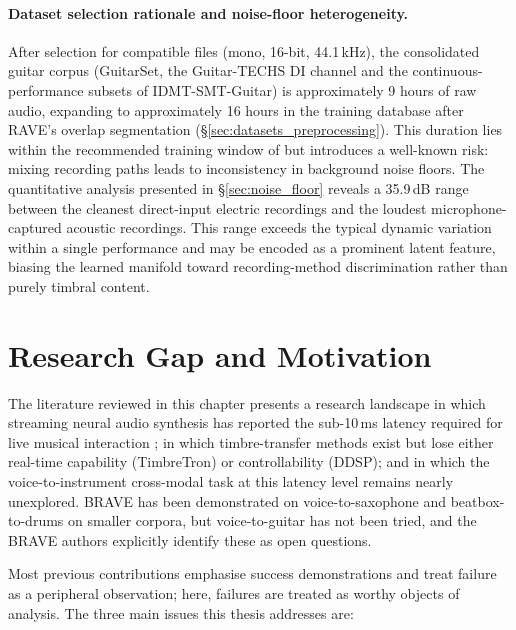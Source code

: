 \documentclass[a4paper,11pt,oneside,openany]{book}
\begin{document}
\paragraph{Dataset selection rationale and noise-floor heterogeneity.} After selection for compatible files (mono, 16-bit, 44.1\,kHz), the consolidated guitar corpus (GuitarSet, the Guitar-TECHS DI channel and the continuous-performance subsets of IDMT-SMT-Guitar) is approximately 9 hours of raw audio, expanding to approximately 16 hours in the training database after RAVE's overlap segmentation (\S\ref{sec:datasets_preprocessing}). This duration lies within the recommended training window of \textcite{caillon2021rave} but introduces a well-known risk: mixing recording paths leads to inconsistency in background noise floors. The quantitative analysis presented in \S\ref{sec:noise_floor} reveals a 35.9\,dB range between the cleanest direct-input electric recordings and the loudest microphone-captured acoustic recordings. This range exceeds the typical dynamic variation within a single performance and may be encoded as a prominent latent feature, biasing the learned manifold toward recording-method discrimination rather than purely timbral content.

\section{Research Gap and Motivation}\label{sec:research_gap}

The literature reviewed in this chapter presents a research landscape in which streaming neural audio synthesis has reported the sub-10\,ms latency required for live musical interaction \parencite{caspe2025brave}; in which timbre-transfer methods exist but lose either real-time capability (TimbreTron) or controllability (DDSP); and in which the voice-to-instrument cross-modal task at this latency level remains nearly unexplored. BRAVE has been demonstrated on voice-to-saxophone and beatbox-to-drums on smaller corpora, but voice-to-guitar has not been tried, and the BRAVE authors explicitly identify these as open questions.

Most previous contributions emphasise success demonstrations and treat failure as a peripheral observation; here, failures are treated as worthy objects of analysis. The three main issues this thesis addresses are:
\end{document}
